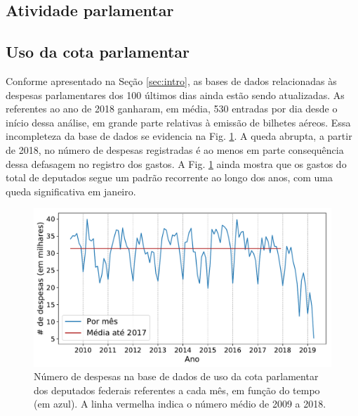 \documentclass[12pt,a4paper]{article}
\newcommand{\HX}[1]{{\centering\color{red}\large<#1>}}
\begin{document}
\HX{Incluir análise histórica da distribuição de cargos}

\subsection{Atividade parlamentar}

\HX{Incluir seção sobre atividade parlamentar na câmara e no senado}

\subsection{Uso da cota parlamentar}

Conforme apresentado na Seção \ref{sec:intro}, as bases de dados relacionadas às despesas parlamentares dos 100 últimos
dias ainda estão sendo atualizadas. As referentes ao ano de 2018 ganharam, em média, 530 entradas por dia desde o início
dessa análise, em grande parte relativas à emissão de bilhetes aéreos. Essa incompleteza da base de dados se evidencia
na Fig. \ref{fig:n-despesas-por-mes}. A queda abrupta, a partir de 2018, no número de despesas registradas é ao menos
em parte consequência dessa defasagem no registro dos gastos. A Fig. \ref{fig:n-despesas-por-mes} ainda mostra que
os gastos do total de deputados segue um padrão recorrente ao longo dos anos, com uma queda significativa em janeiro.

\begin{figure}[H]
\centering
\includegraphics[width=1.0\textwidth]{graficos/n_despesas_por_mes_2019-04-29.pdf}
\caption{Número de despesas na base de dados de uso da cota parlamentar dos deputados federais
  referentes a cada mês, em função do tempo (em azul).
  A linha vermelha indica o número médio de 2009 a 2018.}
\label{fig:n-despesas-por-mes}
\end{figure} 
\end{document}
